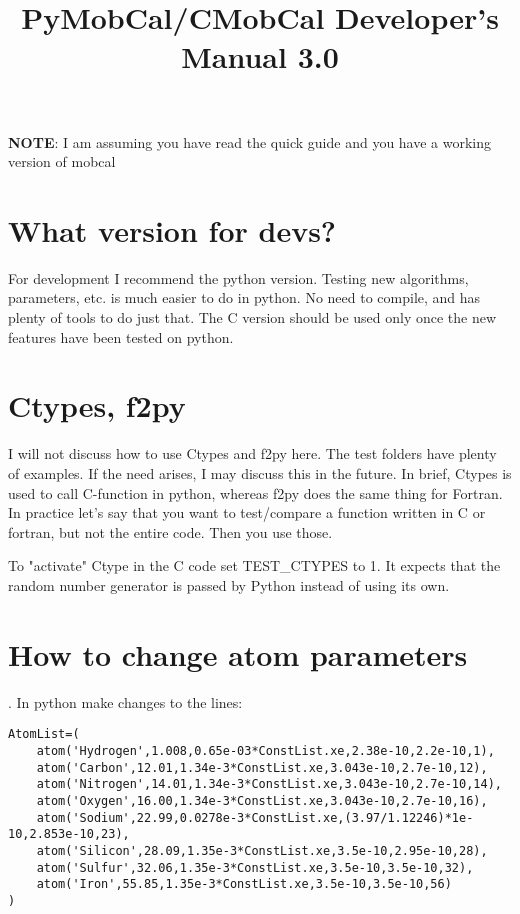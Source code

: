 \documentclass[letter,12pt]{article}
\begin{document}
\title{PyMobCal/CMobCal Developer's Manual 3.0} 
\maketitle

\textbf{NOTE}: I am assuming you have read the quick guide and you have a working version of mobcal

\section{What version for devs?}
For development I recommend  the python version. Testing new algorithms, parameters, etc. is much easier to do in python.
No need to compile, and has plenty of tools to do just that. The C version should be used only once the new features have been
tested on python.

\section{Ctypes, f2py}
I will not discuss how to use Ctypes and f2py here. The test folders have plenty of examples. If the need arises, 
I may discuss this in the future. In brief, Ctypes is used to call C-function in python, whereas f2py does the same thing for Fortran.
In practice let's say that you want to test/compare a function written in C or fortran, but not the entire code. Then you use those.

To "activate" Ctype in the C code set TEST\_CTYPES  to 1. It expects that the random number generator is passed by Python instead of using its own.

\section{How to change atom parameters}.
In python make changes to the lines:

\begin{verbatim}
AtomList=(
    atom('Hydrogen',1.008,0.65e-03*ConstList.xe,2.38e-10,2.2e-10,1),
    atom('Carbon',12.01,1.34e-3*ConstList.xe,3.043e-10,2.7e-10,12),
    atom('Nitrogen',14.01,1.34e-3*ConstList.xe,3.043e-10,2.7e-10,14),
    atom('Oxygen',16.00,1.34e-3*ConstList.xe,3.043e-10,2.7e-10,16),
    atom('Sodium',22.99,0.0278e-3*ConstList.xe,(3.97/1.12246)*1e-10,2.853e-10,23),
    atom('Silicon',28.09,1.35e-3*ConstList.xe,3.5e-10,2.95e-10,28),
    atom('Sulfur',32.06,1.35e-3*ConstList.xe,3.5e-10,3.5e-10,32),
    atom('Iron',55.85,1.35e-3*ConstList.xe,3.5e-10,3.5e-10,56)
)
\end{verbatim}
\end{document}
